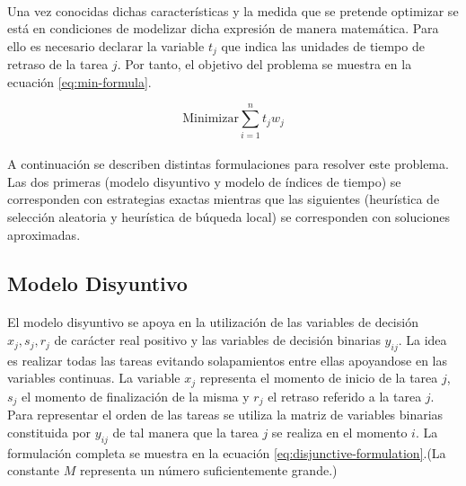 \documentclass[spanish]{article}
\begin{document}
		\paragraph{}
		Una vez conocidas dichas características y la medida que se pretende optimizar se está en condiciones de modelizar dicha expresión de manera matemática. Para ello es necesario declarar la variable $t_j$ que indica las unidades de tiempo de retraso de la tarea $j$. Por tanto, el objetivo del problema se muestra en la ecuación \eqref{eq:min-formula}.

		\begin{equation}
		\label{eq:min-formula}
			\text{Minimizar} \displaystyle\sum\limits_{i = 1}^{n} t_{j}w_{j}
		\end{equation}

		\paragraph{}
		A continuación se describen distintas formulaciones para resolver este problema. Las dos primeras (modelo disyuntivo y modelo de índices de tiempo) se corresponden con estrategias exactas mientras que las siguientes (heurística de selección aleatoria y heurística de búqueda local) se corresponden con soluciones aproximadas.

		\subsection{Modelo Disyuntivo}
		\label{sec:disyuntive}

			\paragraph{}
			El modelo disyuntivo se apoya en la utilización de las variables de decisión $x_{j}, s_{j}, r_{j}$ de carácter real positivo y las variables de decisión binarias $y_{ij}$. La idea es realizar todas las tareas evitando solapamientos entre ellas apoyandose en las variables continuas. La variable $x_{j}$ representa el momento de inicio de la tarea $j$, $s_{j}$ el momento de finalización de la misma y $r_{j}$ el retraso referido a la tarea $j$. Para representar el orden de las tareas se utiliza la matriz de variables binarias constituida por $y_{ij}$ de tal manera que la tarea $j$ se realiza en el momento $i$. La formulación completa se muestra en la ecuación \eqref{eq:disjunctive-formulation}.(La constante $M$ representa un número suficientemente grande.)
\end{document}
